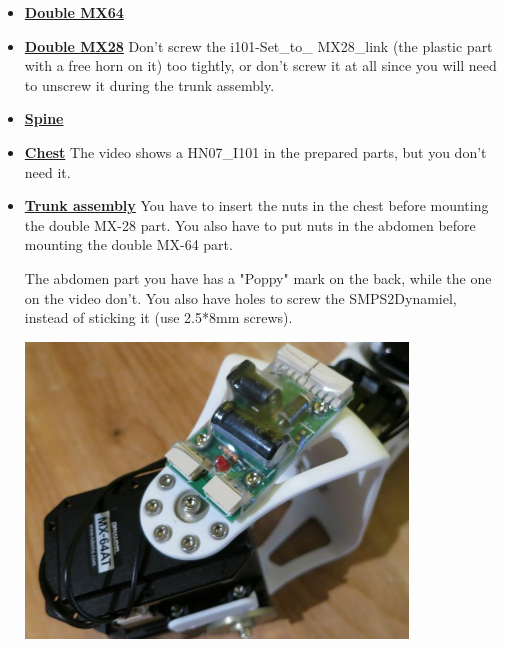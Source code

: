 \documentclass[includefoot]{article}
\begin{document}
 \begin{itemize}
\item \textbf{\href{https://github.com/poppy-project/Robotis-library/blob/master/doc/en/double\_MX64\_assembly.md}{Double MX64}}
\item \textbf{\href{https://github.com/poppy-project/Robotis-library/blob/master/doc/en/double\_MX28\_assembly.md}{Double MX28}} Don't screw the i101-Set\_to\_ MX28\_link (the plastic part with a free horn on it) too tightly, or don't screw it at all since you will need to unscrew it during the trunk assembly.
\item \textbf{\href{https://github.com/poppy-project/Poppy-multiarticulated-torso/blob/master/doc/en/subassembly/spine\_assembly\_instructions.md}{Spine}}
\item \textbf{\href{https://github.com/poppy-project/Poppy-multiarticulated-torso/blob/master/doc/en/subassembly/chest\_assembly\_instructions.md}{Chest}} The video shows a HN07\_I101 in the prepared parts, but you don't need it.
\item \textbf{\href{https://github.com/poppy-project/Poppy-multiarticulated-torso/blob/master/doc/en/5\_DoFs\_humanoid\_spine.md}{Trunk assembly}} You have to insert the nuts in the chest before mounting the double MX-28 part. You also have to put nuts in the abdomen before mounting the double MX-64 part.

The abdomen part you have has a "Poppy" mark on the back, while the one on the video don't. You also have holes to screw the SMPS2Dynamiel, instead of sticking it (use 2.5*8mm screws).
\begin{center}
  \includegraphics[width=0.8\textwidth]{img/screwed_SMPS}
\end{center}
\end{itemize}
\end{document}
